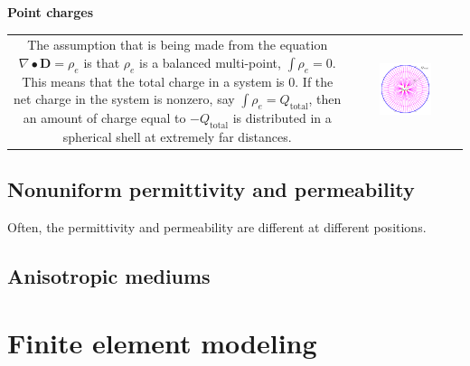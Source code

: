 \textbf{Point charges}

\begin{tabular}{cc}
\parbox{0.5\textwidth}{
The assumption that is being made from the equation \(\nabla \bullet \mathbf{D} = \rho_e\) is that \(\rho_e\) is a balanced multi-point, \(\int \rho_e = 0\). This means that the total charge in a system is \(0\). If the net charge in the system is nonzero, say \(\int \rho_e = Q_{\text{total}}\), then an amount of charge equal to \(-Q_{\text{total}}\) is distributed in a spherical shell at extremely far distances.   
} & \parbox{0.5\textwidth}{
\includegraphics[width = 0.5\textwidth]{Duality/charge_sphere_at_infinity}
}
\end{tabular}




\subsection{Nonuniform permittivity and permeability} 

Often, the permittivity and permeability are different at different positions.



\subsection{Anisotropic mediums}



\section{Finite element modeling}







